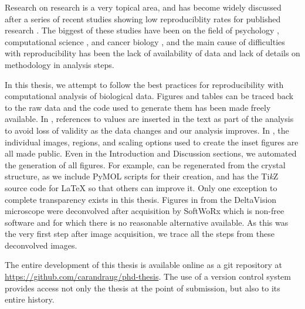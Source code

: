 
Research on research is a very topical area, and has become widely
discussed after a series of recent
studies showing low reproduciblity rates for
published research \citep{ioannidis2015meta}.  The
biggest of these studies have been on the field of
psychology \citep{open2015estimating},
computational science \citep{collberg2016repeatability},
and cancer biology \citep{prinz2011believe, ioannidis2009repeatability},
and the main cause of difficulties with
reproducibility has been the lack of availability of
data and lack of details on methodology in analysis steps.

In this thesis, we attempt to follow the best practices for
reproducibility with computational analysis of biological data.
Figures and tables can be traced back to the raw
data and the code used to generate them has been made freely available.  In
, references to values are inserted in the
text as part of the analysis to avoid loss of validity as the data
changes and our analysis improves.  In , the
individual images, regions, and scaling options used to create the
inset figures are all made public.  Even in the Introduction and
Discussion sections, we
automated the generation of all figures.  For example,
 can be regenerated from the
crystal structure, as we include PyMOL
scripts for their creation, and
 has the Ti\textit{k}Z source code
for \LaTeX{} so that
others can improve it.  Only one exception to complete transparency
exists in this thesis.  Figures in
 from the DeltaVision microscope were deconvolved after
acquisition by SoftWoRx which is non-free software and for which there
is no reasonable alternative available.
As this was the
very first step after image acquisition, we trace all the steps from these
deconvolved images.


The entire development of this thesis is available online as a git
repository at \url{https://github.com/carandraug/phd-thesis}.  The use
of a version control system provides access not only the thesis at the
point of submission, but also to its entire history.

